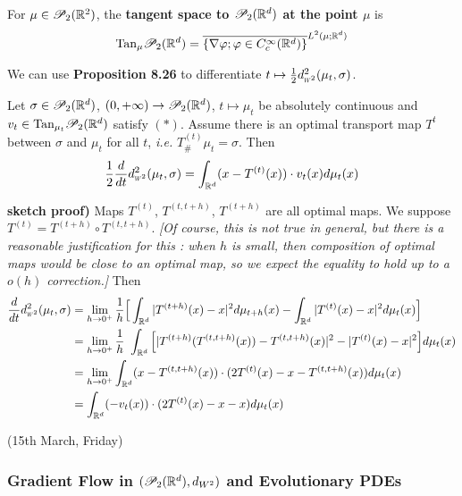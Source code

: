 \documentclass[12pt,a4paper]{article}
\newenvironment{proof}
{\begin{changemargin}{1cm}{0.5cm} 
	}%
	{\end{changemargin}
}
\newenvironment{p}
{\begin{proof} 
	}%
	{\end{proof}
}
\begin{document}
 For $\mu\in \mathscr{P}_2(\mathbb{R}^2)$, the \textbf{tangent space to $\mathscr{P}_2(\mathbb{R}^d)$ at the point $\mu$} is
\begin{align*}
\text{Tan}_{\mu} \mathscr{P}_2(\mathbb{R}^d) = \overline{ \{ \nabla \varphi ; \varphi \in C_c^{\infty}(\mathbb{R}^d)\}}^{L^2(\mu ; \mathbb{R}^d)}
\end{align*}
\s

We can use \textbf{Proposition 8.26} to differentiate $t\mapsto \frac{1}{2} \wa{2}^2(\mu_t, \sigma)$.
\s

 Let $\sigma \in \mathscr{P}_2(\mathbb{R}^d)$, $(0, + \infty) \rightarrow \mathscr{P}_2(\mathbb{R}^d)$, $t\mapsto \mu_t$ be absolutely continuous and $v_t \in \text{Tan}_{\mu_t} \mathscr{P}_2(\mathbb{R}^d)$ satisfy $(*)$. Assume there is an optimal transport map $T^{t}$ between $\sigma$ and $\mu_t$ for all $t$, \textit{i.e.} $T^{(t)}_{\#} \mu_t =\sigma$. Then
\begin{align*}
\frac{1}{2} \frac{d}{dt} \wa{2}^2 (\mu_t, \sigma) = \int_{\reals^d}(x- T^{(t)}(x))\cdot v_t(x) d\mu_t(x)
\end{align*}
\begin{p}
\textbf{sketch proof)} Maps $T^{(t)}$, $T^{(t, t+h)}$, $T^{(t+h)}$ are all optimal maps. We suppose $T^{(t)} = T^{(t+h)} \circ T^{(t, t+h)}$. \emph{[Of course, this is not true in general, but there is a reasonable justification for this : when $h$ is small, then composition of optimal maps would be close to an optimal map, so we expect the equality to hold up to a $o(h)$ correction.]} Then
\begin{align*}
\frac{d}{dt} \wa{2}^2 (\mu_t, \sigma) &= \lim_{h\rightarrow 0^+} \frac{1}{h} \Big[ \int_{\reals^d} |T^{(t+h)}(x) -x|^2  d\mu_{t+h}(x) - \int_{\reals^d} |T^{(t)}(x) - x|^2 d\mu_t(x) \Big] \\
&= \lim_{h\rightarrow 0^+} \frac{1}{h}  \ \int_{\reals^d} \Big[ | T^{(t+h)}(T^{(t, t+h)}(x)) - T^{(t, t+h)}(x) |^2 - |T^{(t)} (x) - x|^2  \Big] d\mu_t(x) \\
&= \lim_{h\rightarrow 0^+} \int_{\reals^d} (x- T^{(t, t+h)}(x)) \cdot (2T^{(t)}(x) - x - T^{(t, t+h)}(x)) d\mu_t(x) \\
&= \int_{\reals^d} (-v_t(x)) \cdot (2T^{(t)}(x) - x - x) d\mu_t(x)
\end{align*}
\eop
\end{p}
\s

\newday

(15th March, Friday)

\subsubsection{Gradient Flow in $(\mathscr{P}_2(\mathbb{R}^d), d_{W^2})$ and Evolutionary PDEs}
\end{document}
